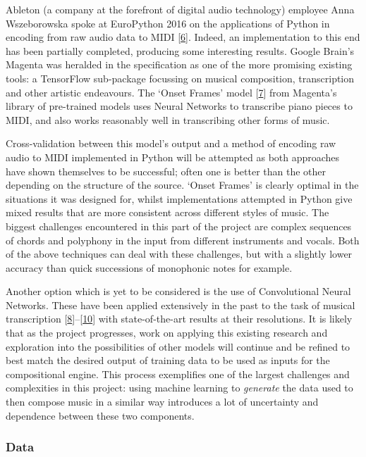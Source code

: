 \documentclass[12pt,]{article}
\begin{document}
Ableton (a company at the forefront of digital audio technology)
employee Anna Wszeborowska spoke at EuroPython 2016 on the applications
of Python in encoding from raw audio data to MIDI
{[}\protect\hyperlink{ref-annaw}{6}{]}. Indeed, an implementation to
this end has been partially completed, producing some interesting
results. Google Brain's Magenta was heralded in the specification as one
of the more promising existing tools: a TensorFlow sub-package focussing
on musical composition, transcription and other artistic endeavours. The
`Onset Frames' model {[}\protect\hyperlink{ref-magentaonsetframes}{7}{]}
from Magenta's library of pre-trained models uses Neural Networks to
transcribe piano pieces to MIDI, and also works reasonably well in
transcribing other forms of music.

Cross-validation between this model's output and a method of encoding
raw audio to MIDI implemented in Python will be attempted as both
approaches have shown themselves to be successful; often one is better
than the other depending on the structure of the source. `Onset Frames'
is clearly optimal in the situations it was designed for, whilst
implementations attempted in Python give mixed results that are more
consistent across different styles of music. The biggest challenges
encountered in this part of the project are complex sequences of chords
and polyphony in the input from different instruments and vocals. Both
of the above techniques can deal with these challenges, but with a
slightly lower accuracy than quick successions of monophonic notes for
example.

Another option which is yet to be considered is the use of Convolutional
Neural Networks. These have been applied extensively in the past to the
task of musical transcription
{[}\protect\hyperlink{ref-bereketai}{8}{]}--{[}\protect\hyperlink{ref-sigtia2016end}{10}{]}
with state-of-the-art results at their resolutions. It is likely that as
the project progresses, work on applying this existing research and
exploration into the possibilities of other models will continue and be
refined to best match the desired output of training data to be used as
inputs for the compositional engine. This process exemplifies one of the
largest challenges and complexities in this project: using machine
learning to \emph{generate} the data used to then compose music in a
similar way introduces a lot of uncertainty and dependence between these
two components.

\hypertarget{data}{%
\subsubsection{Data}\label{data}}
\end{document}
